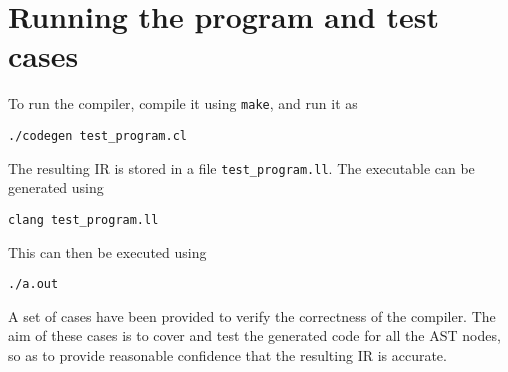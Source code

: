 \documentclass{article}
\begin{document}
\section{Running the program and test cases}
To run the compiler, compile it using \verb|make|, and run it as
\begin{verbatim}
./codegen test_program.cl
\end{verbatim}
The resulting IR is stored in a file \verb|test_program.ll|. The executable can be generated using 
\begin{verbatim}
clang test_program.ll
\end{verbatim}
This can then be executed using
\begin{verbatim}
./a.out
\end{verbatim}
A set of cases have been provided to verify the correctness of the compiler. The aim of these cases is to cover and test the generated code for all the AST nodes, so as to provide reasonable confidence that the resulting IR is accurate.
\end{document}
